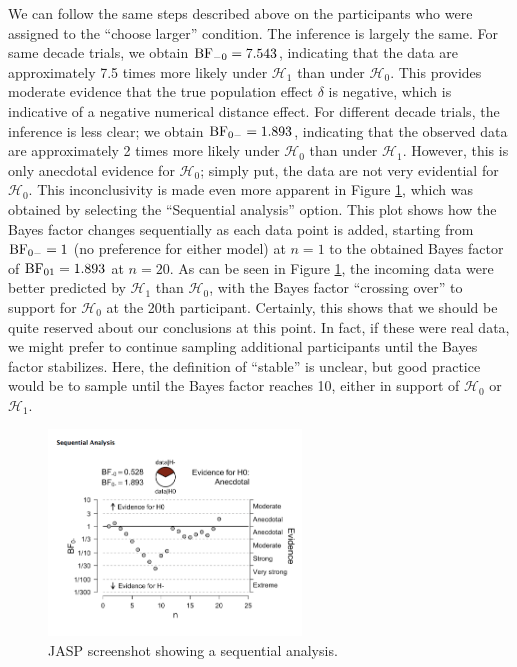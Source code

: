 \documentclass[english,,doc,floatsintext]{apa6}
\begin{document}
We can follow the same steps described above on the participants who were assigned to the \enquote{choose larger} condition. The inference is largely the same. For same decade trials, we obtain \(\textnormal{BF}_{-0}=7.543\), indicating that the data are approximately 7.5 times more likely under \(\mathcal{H}_{1}\) than under \(\mathcal{H}_{0}\). This provides moderate evidence that the true population effect \(\delta\) is negative, which is indicative of a negative numerical distance effect. For different decade trials, the inference is less clear; we obtain \(\textnormal{BF}_{0-}=1.893\), indicating that the observed data are approximately 2 times more likely under \(\mathcal{H}_{0}\) than under \(\mathcal{H}_{1}\). However, this is only anecdotal evidence for \(\mathcal{H}_{0}\); simply put, the data are not very evidential for \(\mathcal{H}_{0}\). This inconclusivity is made even more apparent in Figure \ref{fig:ttestSequential}, which was obtained by selecting the \enquote{Sequential analysis} option. This plot shows how the Bayes factor changes sequentially as each data point is added, starting from \(\textnormal{BF}_{0-}=1\) (no preference for either model) at \(n=1\) to the obtained Bayes factor of \(\textnormal{BF}_{01}=1.893\) at \(n=20\). As can be seen in Figure \ref{fig:ttestSequential}, the incoming data were better predicted by \(\mathcal{H}_{1}\) than \(\mathcal{H}_{0}\), with the Bayes factor \enquote{crossing over} to support for \(\mathcal{H}_{0}\) at the 20th participant. Certainly, this shows that we should be quite reserved about our conclusions at this point. In fact, if these were real data, we might prefer to continue sampling additional participants until the Bayes factor stabilizes. Here, the definition of \enquote{stable} is unclear, but good practice would be to sample until the Bayes factor reaches 10, either in support of \(\mathcal{H}_{0}\) or \(\mathcal{H}_{1}\).

\begin{figure}
\centering
\includegraphics[width=0.6\textwidth,height=\textheight]{figures/ttestSequential.png}
\caption{\label{fig:ttestSequential}JASP screenshot showing a sequential analysis.}
\end{figure}
\end{document}
